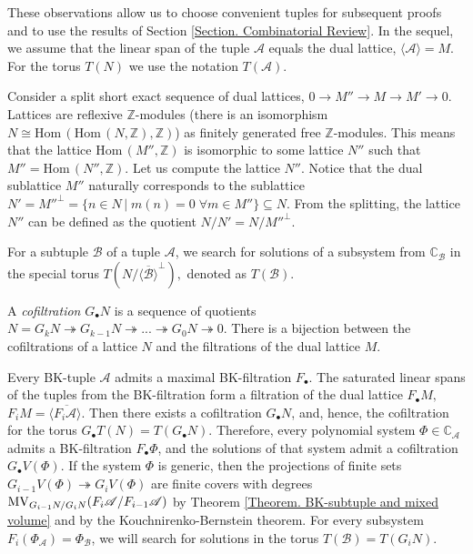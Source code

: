 \documentclass[11pt]{article}
\theoremstyle{plain}
\theoremstyle{definition}
\theoremstyle{remark}
\theoremstyle{plain}
\theoremstyle{plain}
\theoremstyle{plain}
\theoremstyle{definition}
\begin{document}
These observations allow us to choose convenient tuples for subsequent
proofs and to use the results of Section \ref{Section. Combinatorial Review}.
In the sequel, we assume that the linear span of the tuple $\mathscr{A}$
equals the dual lattice, $\langle\mathscr{A}\rangle=M$. For the torus
$T(N)$ we use the notation $T(\mathscr{A})$.

Consider a split short exact sequence of dual lattices, $0\rightarrow M''\rightarrow M\rightarrow M'\rightarrow0$.
Lattices are reflexive $\mathbb{Z}$-modules (there is an isomorphism
$N\cong\mathrm{Hom}\,(\mathrm{Hom}\,(N,\mathbb{Z}),\mathbb{Z})$)
as finitely generated free $\mathbb{Z}$-modules. This means that
the lattice $\mathrm{Hom}\,(M'',\mathbb{Z})$ is isomorphic to some
lattice $N''$ such that $M''=\mathrm{Hom}\,(N'',\mathbb{Z})$. Let
us compute the lattice $N''$. Notice that the dual sublattice $M''$
naturally corresponds to the sublattice $N'=M''^{\perp}=\{n\in N\,|\;m(n)=0\;\forall m\in M''\}\subseteq N.$
From the splitting, the lattice $N''$ can be defined as the quotient
$N/N'=N/M''^{\perp}$.

For a subtuple $\mathscr{B}$ of a tuple $\mathscr{A}$, we search
for solutions of a subsystem from $\mathbb{C}_{\mathscr{B}}$ in the
special torus $T(N/\overline{\langle\mathscr{B}\rangle}^{\bot}),$
denoted as $T(\mathscr{B})$.

A\textbf{ }\textit{cofiltration} $G_{\bullet}N$ is a sequence of
quotients $N=G_{k}N\twoheadrightarrow G_{k-1}N\twoheadrightarrow...\twoheadrightarrow G_{0}N\twoheadrightarrow0.$
There is a bijection between the cofiltrations of a lattice $N$ and
the filtrations of the dual lattice $M$.

Every BK-tuple $\mathscr{A}$ admits a maximal BK-filtration $F_{\bullet}$.
The saturated linear spans of the tuples from the BK-filtration form
a filtration of the dual lattice $F_{\bullet}M,$ $F_{i}M=\overline{\langle F_{i}\mathscr{A}\rangle.}$
Then there exists a cofiltration $G_{\bullet}N$, and, hence, the
cofiltration for the torus $G_{\bullet}T(N)=T(G_{\bullet}N).$ Therefore,
every polynomial system $\Phi\in\mathbb{C}_{\mathscr{A}}$ admits
a BK-filtration $F_{\bullet}\Phi$, and the solutions of that system
admit a cofiltration $G_{\bullet}V(\Phi).$ If the system $\Phi$
is generic, then the projections of finite sets $G_{i-1}V(\Phi)\twoheadrightarrow G_{i}V(\Phi)$
are finite covers with degrees $\mathrm{MV}_{\text{\ensuremath{G_{i-1}N/G_{i}N}}}(F_{i}\mathscr{A}/F_{i-1}\mathscr{A})$
by Theorem \ref{Theorem. BK-subtuple and mixed volume} and by the
Kouchnirenko-Bernstein theorem. For every subsystem $F_{i}(\Phi_{\mathscr{A}})=\Phi_{\mathscr{B}}$,
we will search for solutions in the torus $T(\mathscr{B})=T(G_{i}N).$
\end{document}
